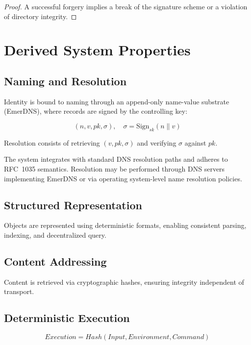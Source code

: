 \documentclass[11pt,a4paper]{article}
\begin{document}
\begin{proof}
A successful forgery implies a break of the signature scheme or a violation of directory integrity.
\end{proof}

\section{Derived System Properties}

\subsection{Naming and Resolution}

Identity is bound to naming through an append-only name-value substrate (EmerDNS), where records are signed by the controlling key:

\begin{equation}
(n, v, pk, \sigma), \quad \sigma = \text{Sign}_{sk}(n \parallel v)
\end{equation}

Resolution consists of retrieving $(v, pk, \sigma)$ and verifying $\sigma$ against $pk$.

The system integrates with standard DNS resolution paths and adheres to RFC~1035 semantics. Resolution may be performed through DNS servers implementing EmerDNS or via operating system-level name resolution policies.

\subsection{Structured Representation}

Objects are represented using deterministic formats, enabling consistent parsing, indexing, and decentralized query.

\subsection{Content Addressing}

Content is retrieved via cryptographic hashes, ensuring integrity independent of transport.

\subsection{Deterministic Execution}

\begin{equation}
Execution = Hash(Input, Environment, Command)
\end{equation}
\end{document}
